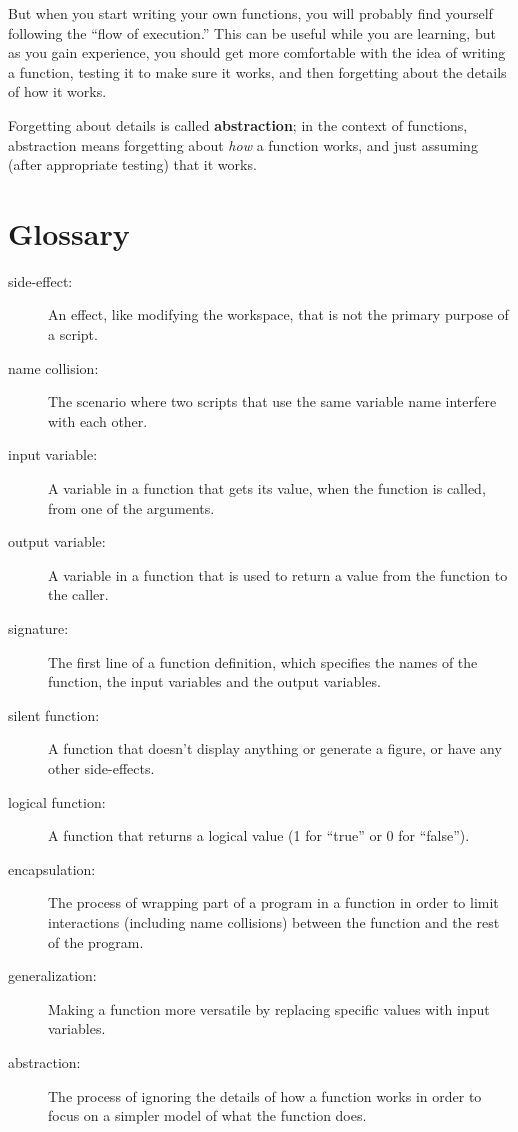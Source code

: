 \documentclass[
]{book}
\begin{document}
But when you start writing your own functions, you will probably
find yourself following the ``flow of execution.''  This can
be useful while you are learning, but as you gain experience, you
should get more comfortable with the idea of writing a function,
testing it to make sure it works, and then forgetting about the
details of how it works.

Forgetting about details is called {\bf abstraction}; in the context
of functions, abstraction means forgetting about {\em how} a function
works, and just assuming (after appropriate testing) that it works.


\section{Glossary}

\begin{description}

\item[side-effect:] An effect, like modifying the workspace, that
is not the primary purpose of a script.

\item[name collision:] The scenario where two scripts that use the
same variable name interfere with each other.

\item[input variable:] A variable in a function that gets its value,
when the function is called, from one of the arguments.

\item[output variable:] A variable in a function that is used to
return a value from the function to the caller.

\item[signature:] The first line of a function definition, which
specifies the names of the function, the input variables and the
output variables.

\item[silent function:] A function that doesn't display anything
or generate a figure, or have any other side-effects.

\item[logical function:] A function that returns a logical value
(1 for ``true'' or 0 for ``false'').

\item[encapsulation:] The process of wrapping part of a program in
a function in order to limit interactions (including name collisions)
between the function and the rest of the program.

\item[generalization:] Making a function more versatile by replacing
specific values with input variables.

\item[abstraction:] The process of ignoring the details of how
a function works in order to focus on a simpler model of what the
function does.

\end{description}
\end{document}
